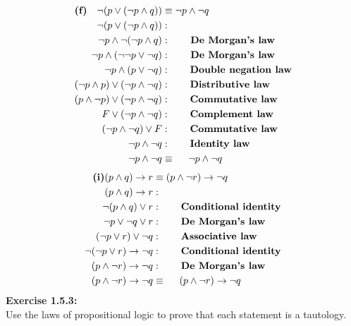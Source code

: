\documentclass[12pt, letterpaper, twoside]{article}
\begin{document}
\begin{align*}
\text{\textbf{(f)}} \quad \neg{(}p \lor (\neg{p} \land q)) &\equiv \neg{p} \land \neg{q}\\
 \neg{(}p \lor (\neg{p} \land q)) &: \\
 \neg{p} \land \neg{(} \neg{p} \land q)	&:\ \ \quad \text{\textbf{ De Morgan’s law}} \\
 \neg{p} \land (\neg{\neg{p}} \lor \neg{q})	&:\ \ \quad	\text{\textbf{ De Morgan’s law}}\\
 \neg{p} \land (p \lor \neg{q})		&:\qquad	\text{\textbf{Double negation law}}\\
 (\neg{p} \land p) \lor (\neg{p} \land \neg{q})	&:\qquad	\text{\textbf{Distributive law}}\\
 (p \land \neg{p}) \lor (\neg{p} \land \neg{q})	&:\qquad	\text{\textbf{Commutative law}}\\
 F \lor (\neg{p} \land \neg{q})	&:	\qquad	\text{\textbf{Complement law}}\\
 (\neg{p} \land \neg{q}) \lor F	&:	\qquad	\text{\textbf{Commutative law}}\\
 \neg{p} \land \neg{q}		&:	\qquad	\text{\textbf{Identity law}}\\
 \neg{p} \land \neg{q} &\equiv\quad \  \neg{p} \land \neg{q}
\end{align*}
\begin{align*}
\text{\textbf{(i)}}(p \land q) \to r   &\equiv   (p \land \neg{r}) \to \neg{q}\\
(p \land q) \to r &:\\
\neg{(}p \land q) \lor r			&:\qquad \text{\textbf{Conditional identity}}\\
\neg{p} \lor \neg{q} \lor r			&:\qquad \text{\textbf{De Morgan’s law}}\\
(\neg{p} \lor r) \lor \neg{q}			&:\qquad \text{\textbf{Associative law}}\\
\neg{(}\neg{p} \lor r) \to \neg{q}		&:\qquad \text{\textbf{Conditional identity}}\\
(p \land \neg{r}) \to \neg{q}		&:\qquad \text{\textbf{De Morgan’s law}}\\
(p \land \neg{r}) \to \neg{q} &\equiv\quad \   (p \land \neg{r}) \to \neg{q}\\
\end{align*}
\newpage
\noindent\textbf{Exercise 1.5.3:}\\
Use the laws of propositional logic to prove that each statement is a tautology.
\break
\end{document}
